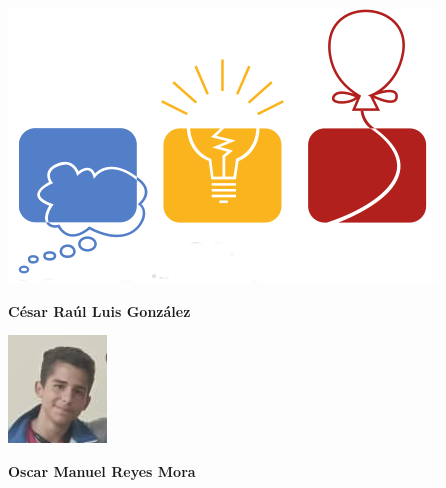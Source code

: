 \begin{minipage}{0.2\textwidth}
	\includegraphics[width=\linewidth]{img/icpc.png} %
\end{minipage}
\hfill
\begin{minipage}{0.7\textwidth}
	\textbf{César Raúl Luis González}
	
\end{minipage}

\begin{minipage}{0.2\textwidth}
	\includegraphics[width=\linewidth]{img/concursantes/oscar.png} %
\end{minipage}
\hfill
\begin{minipage}{0.7\textwidth}
	\textbf{Oscar Manuel Reyes Mora}
	
\end{minipage}

